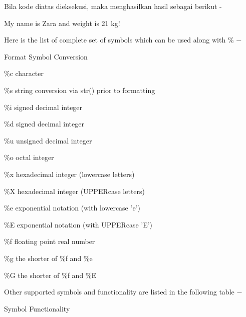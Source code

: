 Bila kode diatas dieksekusi, maka menghasilkan hasil sebagai berikut - \par
\vspace{12pt}
My name is Zara and weight is 21 kg! \par
Here is the list of complete set of symbols which can be used along with  $  \%  $  $ - $ \par
Format Symbol \hspace*{0.5in} Conversion \par
 $  \%  $c \hspace*{0.5in} character \par
 $  \%  $s \hspace*{0.5in} string conversion via str() prior to formatting \par
 $  \%  $i \hspace*{0.5in} signed decimal integer \par
 $  \%  $d \hspace*{0.5in} signed decimal integer \par
 $  \%  $u \hspace*{0.5in} unsigned decimal integer \par
 $  \%  $o \hspace*{0.5in} octal integer \par
 $  \%  $x \hspace*{0.5in} hexadecimal integer (lowercase letters) \par
 $  \%  $X \hspace*{0.5in} hexadecimal integer (UPPERcase letters) \par
 $  \%  $e \hspace*{0.5in} exponential notation (with lowercase 'e') \par
 $  \%  $E \hspace*{0.5in} exponential notation (with UPPERcase 'E') \par
 $  \%  $f \hspace*{0.5in} floating point real number \par
 $  \%  $g \hspace*{0.5in} the shorter of  $  \%  $f and  $  \%  $e \par
 $  \%  $G \hspace*{0.5in} the shorter of  $  \%  $f and  $  \%  $E \par
Other supported symbols and functionality are listed in the following table  $ - $ \par
Symbol \hspace*{0.5in} Functionality \par
